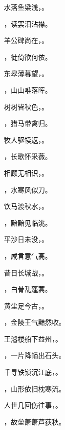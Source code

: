 \documentclass[12pt, a4paper, addpoints]{exam}
\begin{document}
\begin{questions}
\question[2] 水落鱼梁浅，\uline{\qquad\qquad\qquad\qquad}。

\question[2] \uline{\qquad\qquad\qquad\qquad}，读罢泪沾襟。

\question[2] 羊公碑尚在，\uline{\qquad\qquad\qquad\qquad}。

\question[2] \uline{\qquad\qquad\qquad\qquad}，徙倚欲何依。

\question[2] 东皋薄暮望，\uline{\qquad\qquad\qquad\qquad}。

\question[2] \uline{\qquad\qquad\qquad\qquad}，山山唯落晖。

\question[2] 树树皆秋色，\uline{\qquad\qquad\qquad\qquad}。

\question[2] \uline{\qquad\qquad\qquad\qquad}，猎马带禽归。

\question[2] 牧人驱犊返，\uline{\qquad\qquad\qquad\qquad}。

\question[2] \uline{\qquad\qquad\qquad\qquad}，长歌怀采薇。

\question[2] 相顾无相识，\uline{\qquad\qquad\qquad\qquad}。

\question[2] \uline{\qquad\qquad\qquad\qquad}，水寒风似刀。

\question[2] 饮马渡秋水，\uline{\qquad\qquad\qquad\qquad}。

\question[2] \uline{\qquad\qquad\qquad\qquad}，黯黯见临洮。

\question[2] 平沙日未没，\uline{\qquad\qquad\qquad\qquad}。

\question[2] \uline{\qquad\qquad\qquad\qquad}，咸言意气高。

\question[2] 昔日长城战，\uline{\qquad\qquad\qquad\qquad}。

\question[2] \uline{\qquad\qquad\qquad\qquad}，白骨乱蓬蒿。

\question[2] 黄尘足今古，\uline{\qquad\qquad\qquad\qquad}。

\question[2] \uline{\qquad\qquad\qquad\qquad}，金陵王气黯然收。

\question[2] 王濬楼船下益州，\uline{\qquad\qquad\qquad\qquad}。

\question[2] \uline{\qquad\qquad\qquad\qquad}，一片降幡出石头。

\question[2] 千寻铁锁沉江底，\uline{\qquad\qquad\qquad\qquad}。

\question[2] \uline{\qquad\qquad\qquad\qquad}，山形依旧枕寒流。

\question[2] 人世几回伤往事，\uline{\qquad\qquad\qquad\qquad}。

\question[2] \uline{\qquad\qquad\qquad\qquad}，故垒萧萧芦荻秋。


\end{questions}
\end{document}
